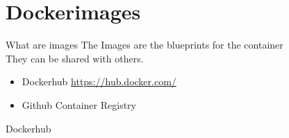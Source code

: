 \documentclass[12pt]{beamer}
\begin{document}
\section{Dockerimages}

\begin{frame}{What are images}
    The Images are the blueprints for the container\\
    They can be shared with others. \\
    \begin{itemize}
        \item Dockerhub \url{https://hub.docker.com/}
        \item Github Container Registry
    \end{itemize}
\end{frame}


\begin{frame}{Dockerhub}
\end{frame}
\end{document}
